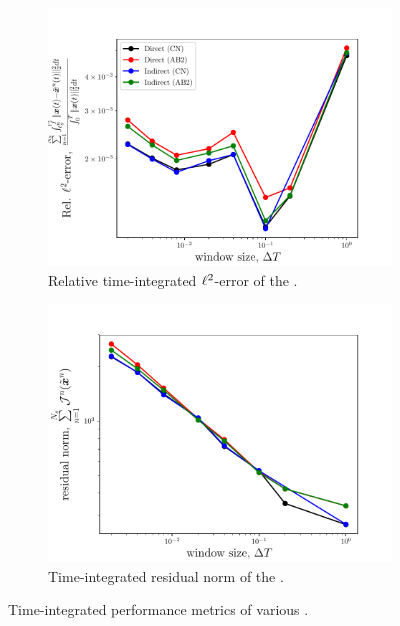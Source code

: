 \begin{figure}
\begin{center}
\begin{subfigure}[t]{0.45\textwidth}
\includegraphics[width=1.\linewidth]{figs/sod/error_vs_window.pdf}
\caption{Relative time-integrated $\ell^2$-error of the \methodAcronymROMs.}
\label{fig:sod_error_methods_a}
\end{subfigure}
\begin{subfigure}[t]{0.45\textwidth}
\includegraphics[width=1.\linewidth]{figs/sod/objective_vs_window.pdf}
\caption{Time-integrated residual norm of the \methodAcronymROMs.} 
\label{fig:sod_error_methods_b}
\end{subfigure}
\caption{Time-integrated performance metrics of various \methodAcronymROMs.} 
\label{fig:sod_error_methods}
\end{center}
\end{figure}


